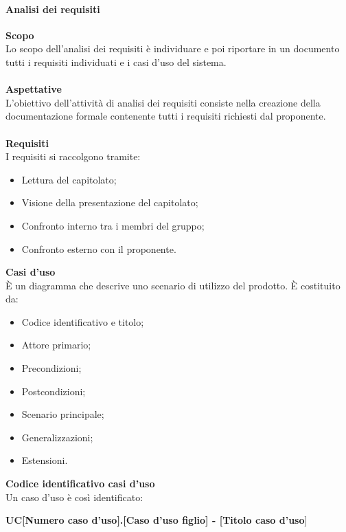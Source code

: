 \paragraph{Analisi dei requisiti}
\textbf{Scopo} \mbox{} \\
Lo scopo dell'analisi dei requisiti è individuare e poi riportare in un documento tutti i requisiti individuati e i casi d'uso del sistema.\\ \mbox{} \\
\textbf{Aspettative} \mbox{} \\
L'obiettivo dell'attività di analisi dei requisiti consiste nella creazione della documentazione formale contenente tutti i requisiti richiesti dal proponente.\\ \mbox{} \\
\textbf{Requisiti} \mbox{} \\
I requisiti si raccolgono tramite:
\begin{itemize}
\item Lettura del capitolato;
\item Visione della presentazione del capitolato;
\item Confronto interno tra i membri del gruppo;
\item Confronto esterno con il proponente.
\end{itemize}
\textbf{Casi d'uso} \mbox{} \\
È un diagramma che descrive uno scenario di utilizzo del prodotto. È costituito da:
\begin{itemize}
\item Codice identificativo e titolo;
\item Attore primario;
\item Precondizioni;
\item Postcondizioni;
\item Scenario principale;
\item Generalizzazioni;
\item Estensioni.
\end{itemize}
\textbf{Codice identificativo casi d'uso} \mbox{} \\
Un caso d'uso è così identificato:

\begin{center}
\textbf{UC[Numero caso d'uso].[Caso d'uso figlio] - [Titolo caso d'uso}]
\end{center}
		
